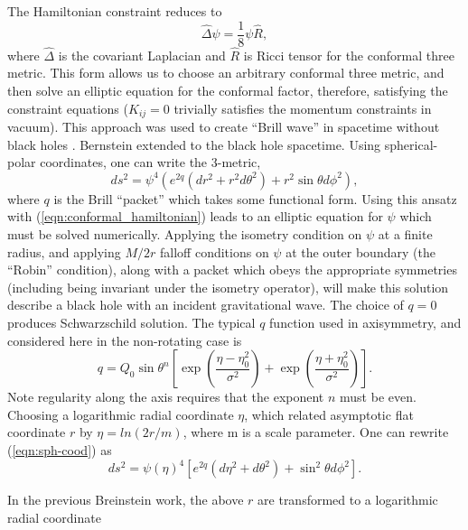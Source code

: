 \documentclass{article}
\begin{document}
The Hamiltonian constraint reduces to
\begin{equation}
\hat \Delta \psi = \frac{1}{8}\psi \hat R,
\label{eqn:conformal_hamiltonian}
\end{equation}
where $\hat \Delta$ is the covariant Laplacian  and $\hat R$ is Ricci
tensor for the conformal three metric. This form allows
us to choose an arbitrary conformal three metric, and then solve an
elliptic equation for the conformal factor, therefore, satisfying the
constraint equations ($K_{ij} = 0$ trivially satisfies the momentum
constraints in vacuum).  This approach was used to create
``Brill wave'' in spacetime without black holes \cite{Brill59}.
Bernstein extended to the black hole spacetime.  Using
spherical-polar coordinates, one can write the 3-metric,
\begin{equation}
\label{eqn:sph-cood}
ds^2 = \psi^4 (e^{2q} (dr^2 + r^2 d \theta^2) + r^2 \sin \theta d
\phi^2),
\end{equation}
where $q$ is the Brill ``packet'' which takes some functional form.
Using this ansatz with (\ref{eqn:conformal_hamiltonian}) leads to
an elliptic equation for $\psi$ which must be solved
numerically. Applying the isometry condition on $\psi$ at a finite
radius, and applying $M/2r$ falloff conditions on $\psi$ at the
outer boundary (the ``Robin'' condition), along with a packet which
obeys the appropriate symmetries (including being invariant under the
isometry operator), will make this solution describe a black hole with
an incident gravitational wave.  The choice of $q=0$ produces
Schwarzschild solution.   The typical $q$ function used in
axisymmetry, and considered here in the non-rotating case is 
\begin{equation}
q = Q_0 \sin \theta^n \left [ \exp\left(\frac{\eta -
      \eta_0^2}{\sigma^2}\right ) + \exp\left(\frac{\eta +
      \eta_0^2}{\sigma^2}\right ) \right ].
\end{equation}
Note regularity along the axis requires that the exponent $n$ must be
even.  Choosing a logarithmic radial coordinate $\eta$, which related
asymptotic flat coordinate $r$ by $\eta = ln (2r/m)$, where m is a
scale parameter.  One can rewrite (\ref{eqn:sph-cood}) as
\begin{equation}
ds^2 = \psi(\eta)^4 [ e^{2 q} (d \eta^2 +  d\theta^2) +  \sin^2
\theta d\phi^2].
\end{equation}

In the previous Breinstein work, the above $r$ are transformed to a
logarithmic radial coordinate
\end{document}
